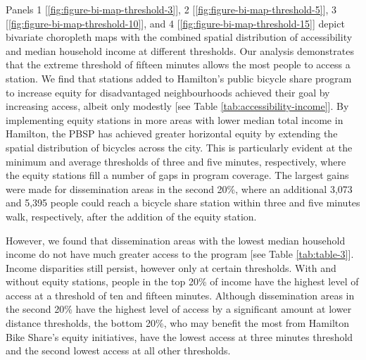 \documentclass[]{elsarticle} %
\begin{document}
Panels 1 {[}\ref{fig:figure-bi-map-threshold-3}{]}, 2
{[}\ref{fig:figure-bi-map-threshold-5}{]}, 3
{[}\ref{fig:figure-bi-map-threshold-10}{]}, and 4
{[}\ref{fig:figure-bi-map-threshold-15}{]} depict bivariate choropleth
maps with the combined spatial distribution of accessibility and median
household income at different thresholds. Our analysis demonstrates that
the extreme threshold of fifteen minutes allows the most people to
access a station. We find that stations added to Hamilton's public
bicycle share program to increase equity for disadvantaged
neighbourhoods achieved their goal by increasing access, albeit only
modestly {[}see Table \ref{tab:accessibility-income}{]}. By implementing
equity stations in more areas with lower median total income in
Hamilton, the PBSP has achieved greater horizontal equity by extending
the spatial distribution of bicycles across the city. This is
particularly evident at the minimum and average thresholds of three and
five minutes, respectively, where the equity stations fill a number of
gaps in program coverage. The largest gains were made for dissemination
areas in the second 20\%, where an additional 3,073 and 5,395 people
could reach a bicycle share station within three and five minutes walk,
respectively, after the addition of the equity station.

However, we found that dissemination areas with the lowest median
household income do not have much greater access to the program {[}see
Table \ref{tab:table-3}{]}. Income disparities still persist, however
only at certain thresholds. With and without equity stations, people in
the top 20\% of income have the highest level of access at a threshold
of ten and fifteen minutes. Although dissemination areas in the second
20\% have the highest level of access by a significant amount at lower
distance thresholds, the bottom 20\%, who may benefit the most from
Hamilton Bike Share's equity initiatives, have the lowest access at
three minutes threshold and the second lowest access at all other
thresholds.
\end{document}
